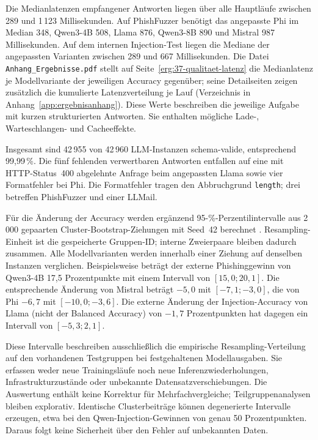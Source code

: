 \documentclass[12pt,twoside=false,a4paper,parskip]{scrbook}
\begin{document}
Die Medianlatenzen empfangener Antworten liegen über alle Hauptläufe zwischen 289 und 1\,123 Millisekunden. Auf PhishFuzzer benötigt das angepasste Phi im Median 348, Qwen3-4B 508, Llama 876, Qwen3-8B 890 und Mistral 987 Millisekunden. Auf dem internen Injection-Test liegen die Mediane der angepassten Varianten zwischen 289 und 667 Millisekunden. Die Datei \texttt{Anhang\_Ergebnisse.pdf} stellt auf Seite~\ref{erg:37-qualitaet-latenz} die Medianlatenz je Modellvariante der jeweiligen Accuracy gegenüber; seine Detailseiten zeigen zusätzlich die kumulierte Latenzverteilung je Lauf (Verzeichnis in Anhang~\ref{app:ergebnisanhang}). Diese Werte beschreiben die jeweilige Aufgabe mit kurzen strukturierten Antworten. Sie enthalten mögliche Lade-, Warteschlangen- und Cacheeffekte.

Insgesamt sind 42\,955 von 42\,960 LLM-Instanzen schema-valide, entsprechend 99{,}99\,\%. Die fünf fehlenden verwertbaren Antworten entfallen auf eine mit HTTP-Status~400 abgelehnte Anfrage beim angepassten Llama sowie vier Formatfehler bei Phi. Die Formatfehler tragen den Abbruchgrund \texttt{length}; drei betreffen PhishFuzzer und einer LLMail.

Für die Änderung der Accuracy werden ergänzend 95-\%-Perzentilintervalle aus 2\,000 gepaarten Cluster-Bootstrap-Ziehungen mit Seed~42 berechnet \cite{efron1979bootstrap}. Resampling-Einheit ist die gespeicherte Gruppen-ID; interne Zweierpaare bleiben dadurch zusammen. Alle Modellvarianten werden innerhalb einer Ziehung auf denselben Instanzen verglichen. Beispielsweise beträgt der externe Phishinggewinn von Qwen3-4B 17{,}5 Prozentpunkte mit einem Intervall von $[15{,}0;20{,}1]$. Die entsprechende Änderung von Mistral beträgt $-5{,}0$ mit $[-7{,}1;-3{,}0]$, die von Phi $-6{,}7$ mit $[-10{,}0;-3{,}6]$. Die externe Änderung der Injection-Accuracy von Llama (nicht der Balanced Accuracy) von $-1{,}7$ Prozentpunkten hat dagegen ein Intervall von $[-5{,}3;2{,}1]$.

Diese Intervalle beschreiben ausschließlich die empirische Resampling-Verteilung auf den vorhandenen Testgruppen bei festgehaltenen Modellausgaben. Sie erfassen weder neue Trainingsläufe noch neue Inferenzwiederholungen, Infrastrukturzustände oder unbekannte Datensatzverschiebungen. Die Auswertung enthält keine Korrektur für Mehrfachvergleiche; Teilgruppenanalysen bleiben explorativ. Identische Clusterbeiträge können degenerierte Intervalle erzeugen, etwa bei den Qwen-Injection-Gewinnen von genau 50 Prozentpunkten. Daraus folgt keine Sicherheit über den Fehler auf unbekannten Daten.
\end{document}
